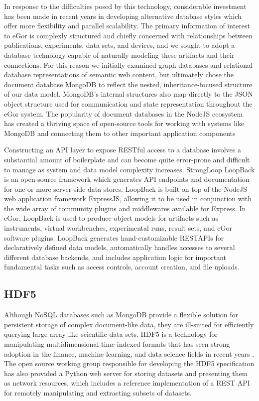 \documentclass[../thesis]{subfiles}
\begin{document}
In response to the difficulties posed by this technology, considerable
investment has been made in recent years in developing alternative
database styles which offer more flexibility and parallel
scalability. The primary information of interest to eGor is complexly
structured and chiefly concerned with relationships between
publications, experiments, data sets, and devices, and we sought to
adopt a database technology capable of naturally modeling these
artifacts and their connections. For this reason we initially examined
graph databases and relational database representations of semantic
web content, but ultimately chose the document database MongoDB to
reflect the nested, inheritance-focused structure of our data
model. MongoDB's internal structures also map directly to the
\gls{JSON} object structure used for communication and state
representation throughout the eGor system. The popularity of document
databases in the NodeJS ecosystem has created a thriving space of
open-source tools for working with systems like MongoDB and connecting
them to other important application components

Constructing an \gls{API} layer to expose \gls{REST}ful access to a
database involves a substantial amount of boilerplate and can become
quite error-prone and difficult to manage as system and data model
complexity increases. StrongLoop LoopBack \cite{LoopBack} is an
open-source framework which generates \gls{API} endpoints and
documentation for one or more server-side data stores.
LoopBack is built on top of the NodeJS web application framework
ExpressJS, allowing it to be used in conjunction with the wide array of
community plugins and middlewares available for Express. In eGor,
LoopBack is used to produce object models for artifacts such as
instruments, virtual workbenches, experimental runs, result sets, and
eGor software plugins. LoopBack generates hand-customizable
\glspl{RESTAPI} for declaratively defined data models, automatically
handles accesses to several different database backends,
and includes application logic for important fundamental tasks such as
access controls, account creation, and file uploads.

\subsection{HDF5}
Although NoSQL databases such as MongoDB provide a flexible solution
for persistent storage of complex document-like data, they are
ill-suited for efficiently querying large array-like scientific data
sets. HDF5 is a technology for manipulating multidimensional
time-indexed formats that has seen strong adoption in the finance, machine
learning, and data science fields in recent years \cite{HDF5}. The
open source working group responsible for developing the HDF5
specification has also provided a Python web server for storing
datasets and presenting them as network resources, which includes a
reference implementation of a REST API for remotely manipulating
and extracting subsets of datasets.
\end{document}
